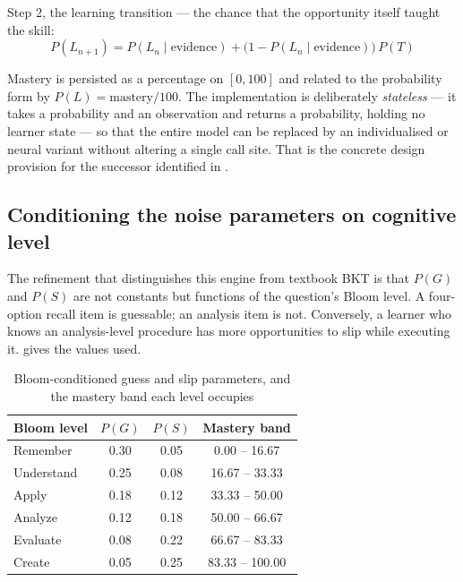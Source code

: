 Step 2, the learning transition --- the chance that the opportunity itself
taught the skill:
\begin{equation}
  P(L_{n+1}) = P(L_n \mid \text{evidence})
             + \bigl(1 - P(L_n \mid \text{evidence})\bigr)\,P(T)
  \label{eq:transition}
\end{equation}

Mastery is persisted as a percentage on $[0,100]$ and related to the
probability form by $P(L) = \text{mastery}/100$. The implementation is
deliberately \emph{stateless} --- it takes a probability and an observation and
returns a probability, holding no learner state --- so that the entire model can
be replaced by an individualised or neural variant
\cite{yudelson2013individualized,piech2015deep} without altering a single call
site. That is the concrete design provision for the successor identified in
.

\subsection{Conditioning the noise parameters on cognitive level}

The refinement that distinguishes this engine from textbook BKT is that $P(G)$
and $P(S)$ are not constants but functions of the question's Bloom level. A
four-option recall item is guessable; an analysis item is not. Conversely, a
learner who knows an analysis-level procedure has more opportunities to slip
while executing it.  gives the values used.

\begin{table}[htbp]
  \centering
  \caption{Bloom-conditioned guess and slip parameters, and the mastery band each level occupies}
  \label{tab:bloom-params}
  \begin{tabular}{lccc}
    \toprule
    Bloom level & $P(G)$ & $P(S)$ & Mastery band \\
    \midrule
    Remember   & 0.30 & 0.05 & 0.00 -- 16.67 \\
    Understand & 0.25 & 0.08 & 16.67 -- 33.33 \\
    Apply      & 0.18 & 0.12 & 33.33 -- 50.00 \\
    Analyze    & 0.12 & 0.18 & 50.00 -- 66.67 \\
    Evaluate   & 0.08 & 0.22 & 66.67 -- 83.33 \\
    Create     & 0.05 & 0.25 & 83.33 -- 100.00 \\
    \bottomrule
  \end{tabular}
\end{table}

